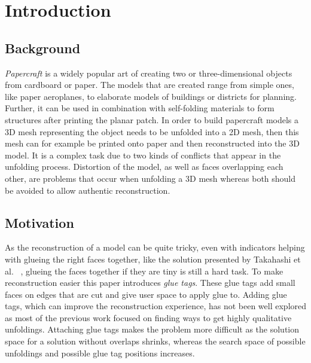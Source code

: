 \documentclass[draft,final]{vutinfth} %
\begin{document}
\mainmatter

\chapter{Introduction}

\section{Background}
\textit{Papercraft} is a widely popular art of creating two or three-dimensional objects from cardboard or paper. The models that are created range from simple ones, like paper aeroplanes, to elaborate models of buildings or districts for planning. Further, it can be used in combination with self-folding materials to form structures after printing the planar patch. In order to build papercraft models a 3D mesh representing the object needs to be unfolded into a 2D mesh, then this mesh can for example be printed onto paper and then reconstructed into the 3D model. It is a complex task due to two kinds of conflicts that appear in the unfolding process. Distortion of the model, as well as faces overlapping each other, are problems that occur when unfolding a 3D mesh whereas both should be avoided to allow authentic reconstruction.

\section{Motivation}
As the reconstruction of a model can be quite tricky, even with indicators helping with glueing the right faces together, like the solution presented by Takahashi et al.
~\cite{takahashi2011optimized}, glueing the faces together if they are tiny is still a hard task.
To make reconstruction easier this paper introduces \textit{glue tags}. These glue tags add small faces on edges that are cut and give user space to apply glue to. Adding glue tags, which can improve the reconstruction experience, has not been well explored as most of the previous work focused on finding ways to get highly qualitative unfoldings. Attaching glue tags makes the problem more difficult as the solution space for a solution without overlaps shrinks, whereas the search space of possible unfoldings and possible glue tag positions increases.
\end{document}
